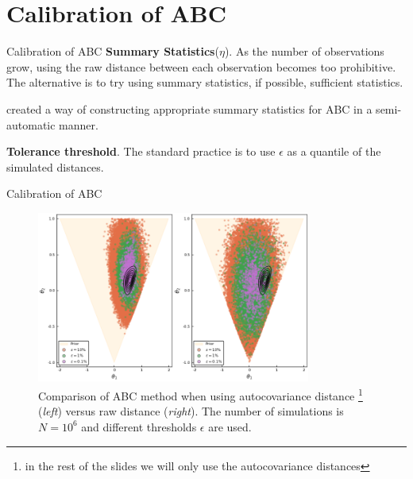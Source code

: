 \documentclass[10pt]{beamer}
\begin{document}
\AtBeginSection{}
\section[Calibration]{Calibration of ABC}
\begin{frame}[fragile]{Calibration of ABC}
  \textbf{Summary Statistics}($\eta$). As the number of observations
  grow, using the raw distance between each observation becomes too
  prohibitive. The alternative is to try using summary statistics,
  if possible, sufficient statistics.

  \citet{fearnhead2010constructing} created a way of constructing
  appropriate summary statistics for ABC in a semi-automatic manner.

  \textbf{Tolerance threshold}. The standard practice is to use 
  $\epsilon$  as a quantile of the simulated distances.

\end{frame}

\begin{frame}[fragile]{Calibration of ABC}

    \begin{figure}[H]
        \centering
        \includegraphics[width=9cm]{images/ABCmodel1_Comparison.png}
        \caption{Comparison of ABC method when using autocovariance
        distance 
\footnote{in the rest of the slides we will
        only use the autocovariance distances}
        (\textit{left}) versus raw distance (\textit{right}).
        The number of simulations is $N = 10^6$ and different
        thresholds $\epsilon$ are used.}
    \end{figure}

\end{frame}
\end{document}
